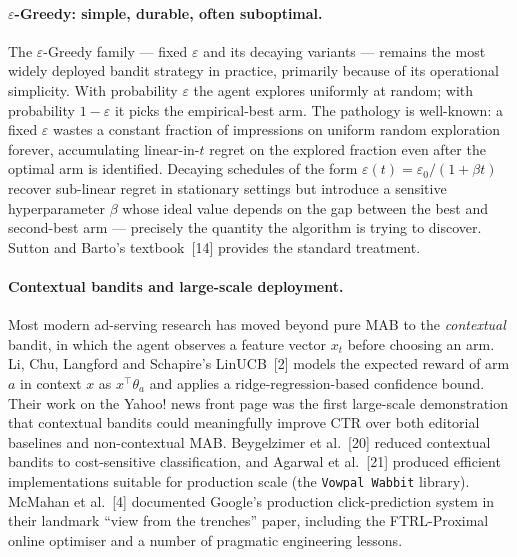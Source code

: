 \paragraph{$\varepsilon$-Greedy: simple, durable, often suboptimal.}
The $\varepsilon$-Greedy family --- fixed $\varepsilon$ and its decaying variants --- remains the most widely deployed bandit strategy in practice, primarily because of its operational simplicity. With probability $\varepsilon$ the agent explores uniformly at random; with probability $1-\varepsilon$ it picks the empirical-best arm. The pathology is well-known: a fixed $\varepsilon$ wastes a constant fraction of impressions on uniform random exploration forever, accumulating linear-in-$t$ regret on the explored fraction even after the optimal arm is identified. Decaying schedules of the form $\varepsilon(t) = \varepsilon_0 / (1 + \beta t)$ recover sub-linear regret in stationary settings but introduce a sensitive hyperparameter $\beta$ whose ideal value depends on the gap between the best and second-best arm --- precisely the quantity the algorithm is trying to discover. Sutton and Barto's textbook~[14] provides the standard treatment.

\paragraph{Contextual bandits and large-scale deployment.}
Most modern ad-serving research has moved beyond pure MAB to the \emph{contextual} bandit, in which the agent observes a feature vector $x_t$ before choosing an arm. Li, Chu, Langford and Schapire's LinUCB~[2] models the expected reward of arm $a$ in context $x$ as $x^\top \theta_a$ and applies a ridge-regression-based confidence bound. Their work on the Yahoo! news front page was the first large-scale demonstration that contextual bandits could meaningfully improve CTR over both editorial baselines and non-contextual MAB. Beygelzimer et al.~[20] reduced contextual bandits to cost-sensitive classification, and Agarwal et al.~[21] produced efficient implementations suitable for production scale (the \texttt{Vowpal Wabbit} library). McMahan et al.~[4] documented Google's production click-prediction system in their landmark ``view from the trenches'' paper, including the FTRL-Proximal online optimiser and a number of pragmatic engineering lessons.


